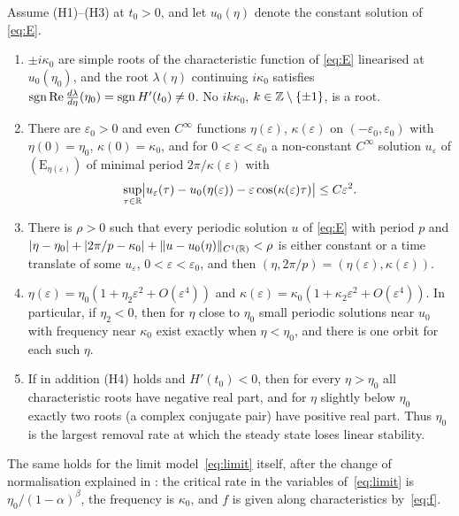 \documentclass[11pt,a4paper]{report}
\begin{document}
\begin{theorem}\label{thm:A}
Assume (H1)--(H3) at $t_0>0$, and let $u_0(\eta)$ denote the constant solution of \eqref{eq:E}.
\begin{enumerate}
\item\label{A:roots} $\pm i\kappa_0$ are simple roots of the characteristic function of \eqref{eq:E} linearised at $u_0(\eta_0)$, and the root $\lambda(\eta)$ continuing $i\kappa_0$ satisfies $\operatorname{sgn}\operatorname{Re}\frac{d\lambda}{d\eta}(\eta_0)=\operatorname{sgn} H'(t_0)\neq0$. No $ik\kappa_0$, $k\in\mathbb{Z}\setminus\{\pm1\}$, is a root.
\item\label{A:branch} There are $\varepsilon_0>0$ and even $C^\infty$ functions $\eta(\varepsilon)$, $\kappa(\varepsilon)$ on $(-\varepsilon_0,\varepsilon_0)$ with $\eta(0)=\eta_0$, $\kappa(0)=\kappa_0$, and for $0<\varepsilon<\varepsilon_0$ a non-constant $C^\infty$ solution $u_\varepsilon$ of $(\mathrm E_{\eta(\varepsilon)})$ of minimal period $2\pi/\kappa(\varepsilon)$ with
\[
\sup_{\tau\in\mathbb{R}}\bigl|u_\varepsilon(\tau)-u_0(\eta(\varepsilon))-\varepsilon\cos(\kappa(\varepsilon)\tau)\bigr|\le C\varepsilon^2 .
\]
\item\label{A:unique} There is $\rho>0$ such that every periodic solution $u$ of \eqref{eq:E} with period $p$ and $|\eta-\eta_0|+|2\pi/p-\kappa_0|+\|u-u_0(\eta)\|_{C^1(\mathbb{R})}<\rho$ is either constant or a time translate of some $u_\varepsilon$, $0<\varepsilon<\varepsilon_0$, and then $(\eta,2\pi/p)=(\eta(\varepsilon),\kappa(\varepsilon))$.
\item\label{A:direction} $\eta(\varepsilon)=\eta_0(1+\eta_2\varepsilon^2+O(\varepsilon^4))$ and $\kappa(\varepsilon)=\kappa_0(1+\kappa_2\varepsilon^2+O(\varepsilon^4))$. In particular, if $\eta_2<0$, then for $\eta$ close to $\eta_0$ small periodic solutions near $u_0$ with frequency near $\kappa_0$ exist exactly when $\eta<\eta_0$, and there is one orbit for each such $\eta$.
\item\label{A:stab} If in addition (H4) holds and $H'(t_0)<0$, then for every $\eta>\eta_0$ all characteristic roots have negative real part, and for $\eta$ slightly below $\eta_0$ exactly two roots (a complex conjugate pair) have positive real part. Thus $\eta_0$ is the largest removal rate at which the steady state loses linear stability.
\end{enumerate}
\end{theorem}

The same holds for the limit model~\eqref{eq:limit} itself, after the change of normalisation explained in : the critical rate in the variables of~\eqref{eq:limit} is $\eta_0/(1-\alpha)^\beta$, the frequency is $\kappa_0$, and $f$ is given along characteristics by~\eqref{eq:f}.
\end{document}
